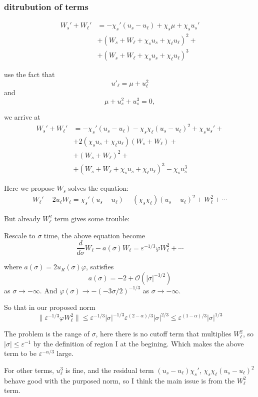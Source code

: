 \documentclass[letterpaper,11pt]{article}
\newcommand{\rmO}{\mathcal{O}}
\newcommand{\eps}{\varepsilon}
\numberwithin{equation}{section}
\theoremstyle{plain}
\begin{document}
\subsubsection{ditrubution of terms}
\begin{align*}
W_s'+W_{\ell}' &= -\chi_s'(u_s - u_\ell) + \chi_s \mu + \chi_s u_s' \\
&+ (W_s+W_\ell+\chi_su_s+\chi_\ell u_\ell)^2+\\
&+(W_s+W_\ell+\chi_su_s+\chi_\ell u_\ell)^3
\end{align*}

use the fact that
\[
u'_{\ell} = \mu + u_\ell^2
\]
and
\[
\mu  + u_s^2 + u_s^3 = 0,
\]

we arrive at
\begin{align*}
W_s'+W_{\ell}' &= -\chi_s'(u_s - u_\ell) - \chi_s\chi_\ell (u_s-u_\ell)^2 + \chi_s u_s' +\\
&+ 2(\chi_su_s+\chi_\ell u_\ell)(W_s+W_\ell)+\\
&+ (W_s+W_\ell)^2+\\
&+(W_s+W_\ell+\chi_su_s+\chi_\ell u_\ell)^3-\chi_s u_s^3
\end{align*}

Here we propose $W_s$ solves the equation:
\begin{align*}
W_\ell' -2u_\ell W_\ell = \chi_s'(u_s-u_\ell)-(\chi_s\chi_\ell)(u_s-u_\ell)^2 + 
W_\ell^2 + \cdots
\end{align*}

But already $W_\ell^2$ term gives some trouble:

Rescale to $\sigma$ time, the above equation become
\[
\frac{d}{d\sigma} W_\ell - a(\sigma) W_\ell  = \eps^{-1/3}\varphi W_\ell^2 + \cdots
\]

where $a(\sigma) = 2u_R(\sigma)\varphi$, satisfies 
\[
a(\sigma) = -2 + \rmO(|\sigma|^{-3/2})
\]
as $\sigma \to -\infty$.
And $\varphi(\sigma) \to -(-3\sigma/2)^{-1/3}$ as $\sigma \to -\infty$.

So that in our proposed norm
\[
\| \eps^{-1/3}\varphi W_\ell^2\| \le \eps^{-1/3}|\sigma|^{-1/3}\eps^{(2-\alpha)/3} |\sigma|^{2/3} \le \eps^{(1-\alpha)/3} |\sigma|^{1/3}
\]

The problem is the range of $\sigma$, here there is no cutoff term that multiplies $W_\ell^2$, so $|\sigma| \le \eps^{-1}$ by the definition of region I at the begining. Which makes the above term to be $\eps^{-\alpha/3}$ large.

For other terms, $u_\ell^3$ is fine, and the residual term $(u_s - u_\ell)\chi_s'$, $\chi_s\chi_\ell(u_s - u_\ell)^2$ behave good with the purposed norm, so I think the main issue is from the $W_\ell^2$ term.
\end{document}
